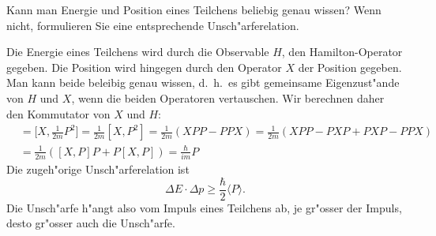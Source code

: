 Kann man Energie und Position eines Teilchens beliebig genau wissen?
Wenn nicht, formulieren Sie eine entsprechende Unsch"arferelation.

\begin{loesung}
Die Energie eines Teilchens wird durch die Observable $H$, den
Hamilton-Operator gegeben.
Die Position wird hingegen durch den Operator $X$ der Position
gegeben.
Man kann beide beleibig genau wissen, d.~h.~es gibt gemeinsame
Eigenzust"ande von $H$ und $X$, wenn die beiden Operatoren vertauschen.
Wir berechnen daher den Kommutator von $X$ und $H$:
\begin{align*}
[X,H]
&=
\biggl[X,\frac1{2m}P^2\biggr]
=
\frac1{2m}[X,P^2]
=
\frac1{2m}(XPP-PPX)
=
\frac1{2m}(XPP-PXP+PXP-PPX)
\\
&=
\frac1{2m}([X,P]P+P[X,P])
=
\frac{\hbar}{im} P
\end{align*}
Die zugeh"orige Unsch"arferelation ist
\[
\Delta E\cdot \Delta p\ge \frac{\hbar}{2}\langle P\rangle.
\]
Die Unsch"arfe h"angt also vom Impuls eines Teilchens ab, je gr"osser
der Impuls, desto gr"osser auch die Unsch"arfe.
\end{loesung}

